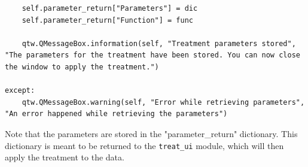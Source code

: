 \begin{enumerate}
\begin{lstlisting}
    self.parameter_return["Parameters"] = dic
    self.parameter_return["Function"] = func

    qtw.QMessageBox.information(self, "Treatment parameters stored", "The parameters for the treatment have been stored. You can now close the window to apply the treatment.")

except:
    qtw.QMessageBox.warning(self, "Error while retrieving parameters", "An error happened while retrieving the parameters")
\end{lstlisting}
    Note that the parameters are stored in the "parameter\_return" dictionary. This dictionary is meant to be returned to the \texttt{treat\_ui} module, which will then apply the treatment to the data.
\end{enumerate}